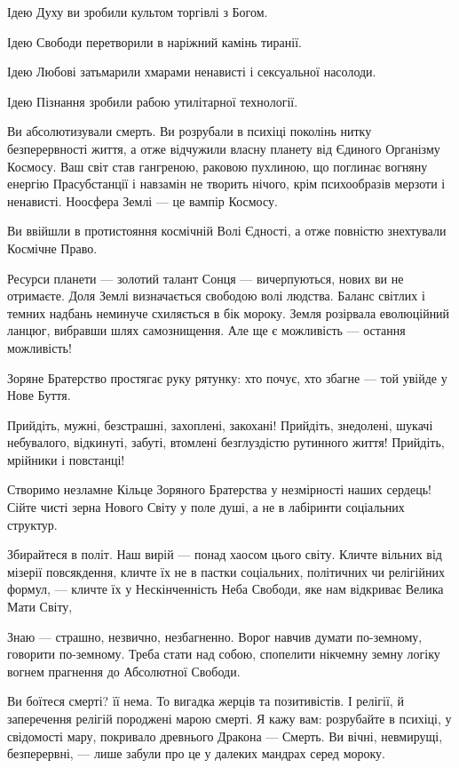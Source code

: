 Ідею Духу ви зробили культом торгівлі з Богом.

Ідею Свободи перетворили в наріжний камінь тиранії.

Ідею Любові затьмарили хмарами ненависті і сексуальної насолоди.

Ідею Пізнання зробили рабою утилітарної технології.

Ви абсолютизували смерть. Ви розрубали в психіці поколінь нитку безперервності
життя, а отже відчужили власну планету від Єдиного Організму Космосу. Ваш світ
став гангреною, раковою пухлиною, що поглинає вогняну енергію Прасубстанції і
навзамін не творить нічого, крім психообразів мерзоти і ненависті. Ноосфера
Землі — це вампір Космосу.

Ви ввійшли в протистояння космічній Волі Єдності, а отже повністю знехтували
Космічне Право.

Ресурси планети — золотий талант Сонця — вичерпуються, нових ви не отримаєте.
Доля Землі визначається свободою волі людства. Баланс світлих і темних надбань
неминуче схиляється в бік мороку. Земля розірвала еволюційний ланцюг, вибравши
шлях самознищення. Але ще є можливість — остання можливість!

Зоряне Братерство простягає руку рятунку: хто почує, хто збагне — той увійде у
Нове Буття.

Прийдіть, мужні, безстрашні, захоплені, закохані! Прийдіть, знедолені, шукачі
небувалого, відкинуті, забуті, втомлені безглуздістю рутинного життя! Прийдіть,
мрійники і повстанці!

Створимо незламне Кільце Зоряного Братерства у незмірності наших сердець! Сійте
чисті зерна Нового Світу у поле душі, а не в лабіринти соціальних структур.

Збирайтеся в політ. Наш вирій — понад хаосом цього світу. Кличте вільних від
мізерії повсякдення, кличте їх не в пастки соціальних, політичних чи релігійних
формул, — кличте їх у Нескінченність Неба Свободи, яке нам відкриває Велика
Мати Світу,

Знаю — страшно, незвично, незбагненно. Ворог навчив думати по-земному, говорити
по-земному. Треба стати над собою, спопелити нікчемну земну логіку вогнем
прагнення до Абсолютної Свободи.

Ви боїтеся смерті? її нема. То вигадка жерців та позитивістів. І релігії, й
заперечення релігій породжені марою смерті. Я кажу вам: розрубайте в психіці, у
свідомості мару, покривало древнього Дракона — Смерть. Ви вічні, невмирущі,
безперервні, — лише забули про це у далеких мандрах серед мороку.

